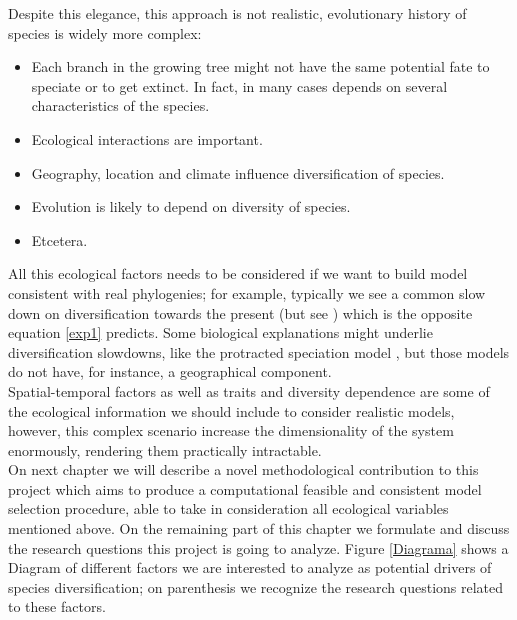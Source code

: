 Despite this elegance, this approach is not realistic, evolutionary history of species is widely more complex:

\begin{itemize}

	\item Each branch in the growing tree might not have the same potential fate to speciate or to get extinct. In fact, in many cases depends on several characteristics of the species.
	 
	\item Ecological interactions are important.
	
	\item Geography, location and climate influence diversification of species.
	
	\item Evolution is likely to depend on diversity of species.
	
	\item Etcetera. 

\end{itemize} 


All this ecological factors needs to be considered if we want to build model consistent with real phylogenies; for example, typically we see a common slow down on diversification towards the present \cite{moen2014does} (but see \cite{jetz2012global}) which is the opposite equation \ref{exp1} predicts. Some biological explanations might underlie diversification slowdowns, like the protracted speciation model \cite{etienne2012prolonging}, but those models do not have, for instance, a geographical component. \\

Spatial-temporal factors as well as traits and diversity dependence are some of the ecological information we should include to consider realistic models, however, this complex scenario increase the dimensionality of the system enormously, rendering them practically intractable.  \\


On next chapter we will describe a novel methodological contribution to this project which aims to produce a computational feasible and consistent model selection procedure, able to take in consideration all ecological variables mentioned above. On the remaining part of this chapter we formulate and discuss the research questions this project is going to analyze. Figure \ref{Diagrama} shows a Diagram of different factors we are interested to analyze as potential drivers of species diversification; on parenthesis we recognize the research questions related to these factors. \\



